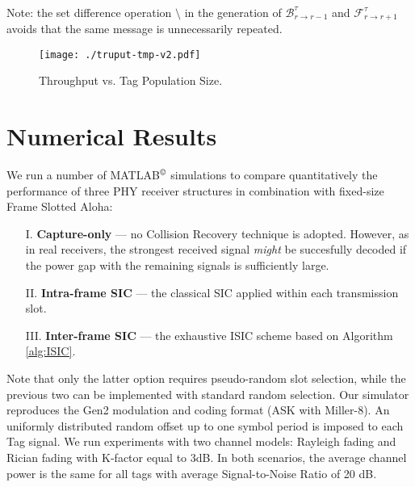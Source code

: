\documentclass[12pt,draftcls,onecolumn]{IEEEtran}
\begin{document}
\begin{algorithm}[!t]
\begin{algorithmic}[0]
\ENDWHILE
\\
\footnotesize{\vspace{2mm}Note: the set difference operation $\setminus$ in the generation of $\mathcal{B}_{r\rightarrow r-1}^{\tau}$ and $\mathcal{F}_{r\rightarrow r+1}^{\tau}$ avoids that the same message is unnecessarily repeated.}
\end{algorithmic}
\end{algorithm}

 \begin{figure}[tb]
\centering
\texttt{[image: ./truput-tmp-v2.pdf]}

\caption{Throughput vs. Tag Population Size.}
\label{fig:truput}
\end{figure}




 \section{Numerical Results}
We run a number of MATLAB$^\copyright$ simulations to compare quantitatively the performance of three PHY receiver structures in combination with  fixed-size Frame Slotted Aloha:
\begin{itemize}
\item[  I.] {\bf{Capture-only}} --- no Collision Recovery technique is adopted. However, as in real receivers,  the strongest received signal \emph{might} be succesfully decoded if the power gap with the remaining signals is sufficiently large.
\item[ II.] {\bf Intra-frame SIC} --- the classical SIC applied within each transmission slot.
\item[III.] {\bf Inter-frame SIC} ---  the exhaustive ISIC scheme based on Algorithm \ref{alg:ISIC}.
\end{itemize}
Note that only the latter option requires pseudo-random slot selection, while the previous two can be implemented with standard random selection. Our simulator reproduces the Gen2 modulation and coding format (ASK with Miller-8). An uniformly distributed random offset up to one symbol period is imposed to each Tag signal.
We run experiments with two channel models: Rayleigh fading and Rician fading with K-factor equal to 3dB. In both scenarios, the average channel power is the same for all tags with average Signal-to-Noise Ratio of 20 dB.  
\end{document}
